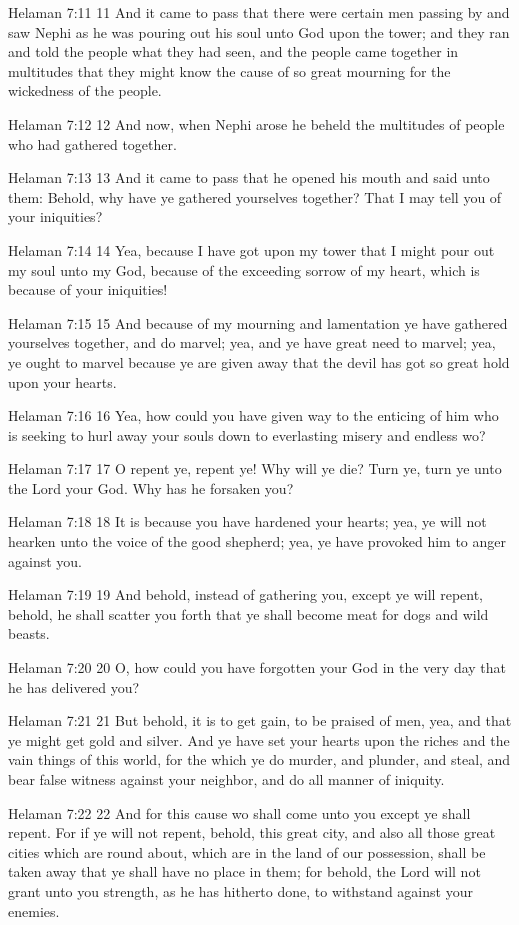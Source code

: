 Helaman 7:11
 11 And it came to pass that there were certain men passing by
and saw Nephi as he was pouring out his soul unto God upon the
tower; and they ran and told the people what they had seen, and
the people came together in multitudes that they might know the
cause of so great mourning for the wickedness of the people.

Helaman 7:12
 12 And now, when Nephi arose he beheld the multitudes of people
who had gathered together.

Helaman 7:13
 13 And it came to pass that he opened his mouth and said unto
them: Behold, why have ye gathered yourselves together? That I
may tell you of your iniquities?

Helaman 7:14
 14 Yea, because I have got upon my tower that I might pour out
my soul unto my God, because of the exceeding sorrow of my heart,
which is because of your iniquities!

Helaman 7:15
 15 And because of my mourning and lamentation ye have gathered
yourselves together, and do marvel; yea, and ye have great need
to marvel; yea, ye ought to marvel because ye are given away that
the devil has got so great hold upon your hearts.

Helaman 7:16
 16 Yea, how could you have given way to the enticing of him who
is seeking to hurl away your souls down to everlasting misery and
endless wo?

Helaman 7:17
 17 O repent ye, repent ye! Why will ye die? Turn ye, turn ye
unto the Lord your God. Why has he forsaken you?

Helaman 7:18
 18 It is because you have hardened your hearts; yea, ye will not
hearken unto the voice of the good shepherd; yea, ye have
provoked him to anger against you.

Helaman 7:19
 19 And behold, instead of gathering you, except ye will repent,
behold, he shall scatter you forth that ye shall become meat for
dogs and wild beasts.

Helaman 7:20
 20 O, how could you have forgotten your God in the very day that
he has delivered you?

Helaman 7:21
 21 But behold, it is to get gain, to be praised of men, yea, and
that ye might get gold and silver. And ye have set your hearts
upon the riches and the vain things of this world, for the which
ye do murder, and plunder, and steal, and bear false witness
against your neighbor, and do all manner of iniquity.

Helaman 7:22
 22 And for this cause wo shall come unto you except ye shall
repent. For if ye will not repent, behold, this great city, and
also all those great cities which are round about, which are in
the land of our possession, shall be taken away that ye shall
have no place in them; for behold, the Lord will not grant unto
you strength, as he has hitherto done, to withstand against your
enemies.

